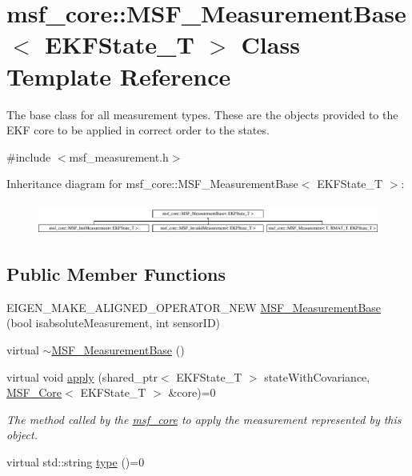 \hypertarget{classmsf__core_1_1MSF__MeasurementBase}{\section{msf\-\_\-core\-:\-:M\-S\-F\-\_\-\-Measurement\-Base$<$ E\-K\-F\-State\-\_\-\-T $>$ Class Template Reference}
\label{classmsf__core_1_1MSF__MeasurementBase}
}


The base class for all measurement types. These are the objects provided to the E\-K\-F core to be applied in correct order to the states.  




{\ttfamily \#include $<$msf\-\_\-measurement.\-h$>$}

Inheritance diagram for msf\-\_\-core\-:\-:M\-S\-F\-\_\-\-Measurement\-Base$<$ E\-K\-F\-State\-\_\-\-T $>$\-:\begin{figure}[H]
\begin{center}
\leavevmode
\includegraphics[height=1.060606cm]{classmsf__core_1_1MSF__MeasurementBase}
\end{center}
\end{figure}
\subsection*{Public Member Functions}
\begin{DoxyCompactItemize}
\item 
E\-I\-G\-E\-N\-\_\-\-M\-A\-K\-E\-\_\-\-A\-L\-I\-G\-N\-E\-D\-\_\-\-O\-P\-E\-R\-A\-T\-O\-R\-\_\-\-N\-E\-W \hyperlink{classmsf__core_1_1MSF__MeasurementBase_a415d8c321cebf22510cce29f69a3b22f}{M\-S\-F\-\_\-\-Measurement\-Base} (bool isabsolute\-Measurement, int sensor\-I\-D)
\item 
virtual \hyperlink{classmsf__core_1_1MSF__MeasurementBase_a259e1cfacc40e58e7c1ed768bcadb54b}{$\sim$\-M\-S\-F\-\_\-\-Measurement\-Base} ()
\item 
virtual void \hyperlink{classmsf__core_1_1MSF__MeasurementBase_ac1c4001e0c61b7cd2b551c0adeae7109}{apply} (shared\-\_\-ptr$<$ E\-K\-F\-State\-\_\-\-T $>$ state\-With\-Covariance, \hyperlink{classmsf__core_1_1MSF__Core}{M\-S\-F\-\_\-\-Core}$<$ E\-K\-F\-State\-\_\-\-T $>$ \&core)=0
\begin{DoxyCompactList}\small\item\em The method called by the \hyperlink{namespacemsf__core}{msf\-\_\-core} to apply the measurement represented by this object. \end{DoxyCompactList}\item 
virtual std\-::string \hyperlink{classmsf__core_1_1MSF__MeasurementBase_a6a711d7ed976c0aed497efc1b8fbe3e7}{type} ()=0
\end{DoxyCompactItemize}
